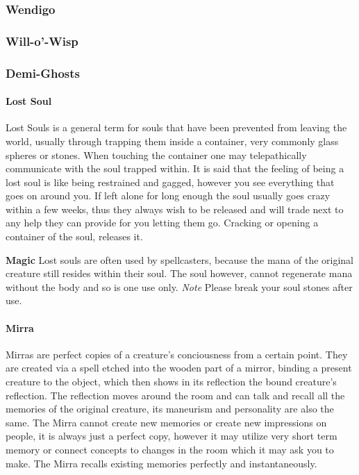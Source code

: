 \hypertarget{wendigo}{%
\subsubsection{Wendigo}\label{wendigo}}

\hypertarget{will-o-wisp}{%
\subsubsection{Will-o'-Wisp}\label{will-o-wisp}}

\hypertarget{demi-ghosts}{%
\subsubsection{Demi-Ghosts}\label{demi-ghosts}}

\hypertarget{lost-soul}{%
\paragraph{Lost Soul}\label{lost-soul}}

Lost Souls is a general term for souls that have been prevented from
leaving the world, usually through trapping them inside a container,
very commonly glass spheres or stones. When touching the container one
may telepathically communicate with the soul trapped within. It is said
that the feeling of being a lost soul is like being restrained and
gagged, however you see everything that goes on around you. If left
alone for long enough the soul usually goes crazy within a few weeks,
thus they always wish to be released and will trade next to any help
they can provide for you letting them go. Cracking or opening a
container of the soul, releases it.

\textbf{Magic} Lost souls are often used by spellcasters, because the
mana of the original creature still resides within their soul. The soul
however, cannot regenerate mana without the body and so is one use only.
\emph{Note} Please break your soul stones after use.

\hypertarget{mirra}{%
\paragraph{Mirra}\label{mirra}}

Mirras are perfect copies of a creature's conciousness from a certain
point. They are created via a spell etched into the wooden part of a
mirror, binding a present creature to the object, which then shows in
its reflection the bound creature's reflection. The reflection moves
around the room and can talk and recall all the memories of the original
creature, its maneurism and personality are also the same. The Mirra
cannot create new memories or create new impressions on people, it is
always just a perfect copy, however it may utilize very short term
memory or connect concepts to changes in the room which it may ask you
to make. The Mirra recalls existing memories perfectly and
instantaneously.

